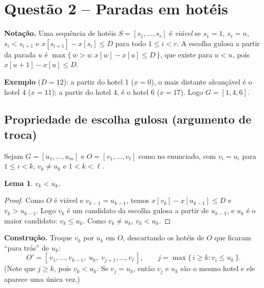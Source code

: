 \documentclass[11pt,a4paper]{article}
\newtheorem{lema}{Lema}
\begin{document}

\section*{Questão 2 -- Paradas em hotéis}
\setcounter{lema}{0}\setcounter{teorema}{0}
\noindent\textbf{Notação.} Uma sequência de hotéis $S=[s_1,\dots,s_r]$ é
\emph{viável} se $s_1 = 1$, $s_r = n$, $s_i < s_{i+1}$ e
$x[s_{i+1}] - x[s_i] \le D$ para todo $1 \le i < r$. A escolha gulosa a partir
da parada $u$ é $\max\{\, w > u : x[w] - x[u] \le D \,\}$, que existe para
$u<n$, pois $x[u+1]-x[u]\le D$.

\noindent\textbf{Exemplo} ($D=12$): a partir do hotel 1 ($x=0$), o mais distante
alcançável é o hotel 4 ($x=11$); a partir do hotel 4, é o hotel 6 ($x=17$).
Logo $G=[1,4,6]$.

\subsection{Propriedade de escolha gulosa (argumento de troca)}

Sejam $G=[u_1,\dots,u_m]$ e $O=[v_1,\dots,v_\ell]$ como no enunciado, com
$v_i = u_i$ para $1\le i<k$, $v_k \ne u_k$ e $1<k<\ell$.

\begin{lema}
$v_k < u_k$.
\end{lema}
\begin{proof}
Como $O$ é viável e $v_{k-1}=u_{k-1}$, temos $x[v_k] - x[u_{k-1}] \le D$ e
$v_k > u_{k-1}$. Logo $v_k$ é um candidato da escolha gulosa a partir de $u_{k-1}$,
e $u_k$ é o maior candidato: $v_k \le u_k$. Como $v_k \ne u_k$, $v_k < u_k$.
\end{proof}

\noindent\textbf{Construção.} Troque $v_k$ por $u_k$ em $O$, descartando os
hotéis de $O$ que ficaram ``para trás'' de $u_k$:
\[
O' = [\,v_1,\dots,v_{k-1},\; u_k,\; v_{j+1},\dots,v_\ell\,],
\qquad j = \max\{\, i \ge k : v_i \le u_k \,\}.
\]
(Note que $j\ge k$, pois $v_k<u_k$. Se $v_j = u_k$, então $v_j$ e $u_k$ são o mesmo
hotel e ele aparece uma única vez.)
\end{document}

